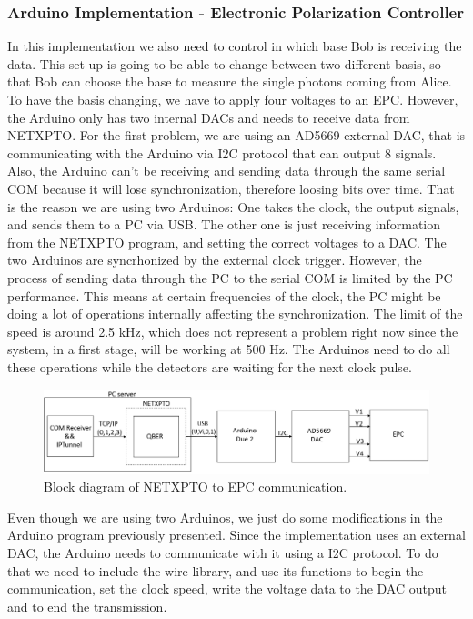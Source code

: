 \begin{refsection}
	\subsubsection{Arduino Implementation - Electronic Polarization Controller }
	In this implementation we also need to control in which base Bob is receiving the data. This set up is going to be able to change between two different basis, so that Bob can choose the base to measure the single photons coming from Alice. To have the basis changing, we have to apply four voltages to an EPC. However, the Arduino only has two internal DACs and needs to receive data from NETXPTO. For the first problem, we are using an AD5669 external DAC, that is communicating with the Arduino via I2C protocol that can output 8 signals. Also, the Arduino can't be receiving and sending data through the same serial COM because it will lose synchronization, therefore loosing bits over time. That is the reason we are using two Arduinos: One takes the clock, the output signals, and sends them to a PC via USB. The other one is just receiving information from the NETXPTO program, and setting the correct voltages to a DAC. The two Arduinos are syncrhonized by the external clock trigger. However, the process of sending data through the PC to the serial COM  is limited by the PC performance. This means at certain frequencies of the clock, the PC might be doing a lot of operations internally affecting the synchronization. The limit of the speed is around 2.5 kHz, which does not represent a problem right now since the system, in a first stage, will be working at 500 Hz. The Arduinos need to do all these operations while the detectors are waiting for the next clock pulse. 
	
	
	\begin{figure}[H]
		
		\centering
		\includegraphics[width=1\linewidth]{./sdf/arduino_quantum_rx/figures/DAC.png}
		\caption{Block diagram of NETXPTO to EPC communication.}
		\label{fig:netxpto}
		
	\end{figure}
	
	Even though we are using two Arduinos, we just do some modifications in the Arduino program previously presented. Since the implementation uses an external DAC, the Arduino needs to communicate with it using a I2C protocol. To do that we need to include the wire library, and use its functions to begin the communication, set the clock speed, write the voltage data to the DAC output and to end the transmission.
	

\end{refsection}
